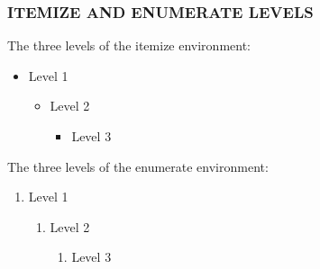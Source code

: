 \documentclass{beamer}
\begin{document}
\begin{frame}
  \frametitle{ITEMIZE AND ENUMERATE LEVELS}
  The three levels of the itemize environment:
  \begin{itemize}
  \item Level 1
    \begin{itemize}
    \item Level 2
      \begin{itemize}
      \item Level 3
      \end{itemize}
    \end{itemize}
  \end{itemize}
  \par
  The three levels of the enumerate environment:
  \begin{enumerate}
  \item Level 1
    \begin{enumerate}
    \item Level 2
      \begin{enumerate}
      \item Level 3
      \end{enumerate}
    \end{enumerate}
  \end{enumerate}
\end{frame}
\end{document}
